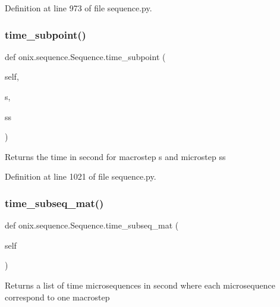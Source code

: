 Definition at line 973 of file sequence.\+py.

\mbox{\label{classonix_1_1sequence_1_1Sequence_a8fc0911f2e6309f2028885f585a9d36a}} 
\subsubsection{\texorpdfstring{time\+\_\+subpoint()}{time\_subpoint()}}
{\footnotesize\ttfamily def onix.\+sequence.\+Sequence.\+time\+\_\+subpoint (\begin{DoxyParamCaption}\item[{}]{self,  }\item[{}]{s,  }\item[{}]{ss }\end{DoxyParamCaption})}

\begin{DoxyVerb}Returns the time in second for macrostep s and microstep ss
\end{DoxyVerb}
 

Definition at line 1021 of file sequence.\+py.

\mbox{\label{classonix_1_1sequence_1_1Sequence_ae9b0583c1a97a3587f6a3e1e0b04651e}} 
\subsubsection{\texorpdfstring{time\+\_\+subseq\+\_\+mat()}{time\_subseq\_mat()}\hspace{0.1cm}{\footnotesize\ttfamily [1/2]}}
{\footnotesize\ttfamily def onix.\+sequence.\+Sequence.\+time\+\_\+subseq\+\_\+mat (\begin{DoxyParamCaption}\item[{}]{self }\end{DoxyParamCaption})}

\begin{DoxyVerb}Returns a list of time microsequences in second where each microsequence correspond 
to one macrostep
\end{DoxyVerb}
 

